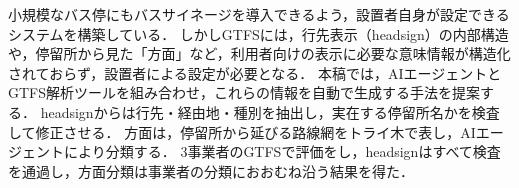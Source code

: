 小規模なバス停にもバスサイネージを導入できるよう，設置者自身が設定できるシステムを構築している．
しかしGTFSには，行先表示（headsign）の内部構造や，停留所から見た「方面」など，利用者向けの表示に必要な意味情報が構造化されておらず，設置者による設定が必要となる．
本稿では，AIエージェントとGTFS解析ツールを組み合わせ，これらの情報を自動で生成する手法を提案する．
headsignからは行先・経由地・種別を抽出し，実在する停留所名かを検査して修正させる．
方面は，停留所から延びる路線網をトライ木で表し，AIエージェントにより分類する．
3事業者のGTFSで評価をし，headsignはすべて検査を通過し，方面分類は事業者の分類におおむね沿う結果を得た．

